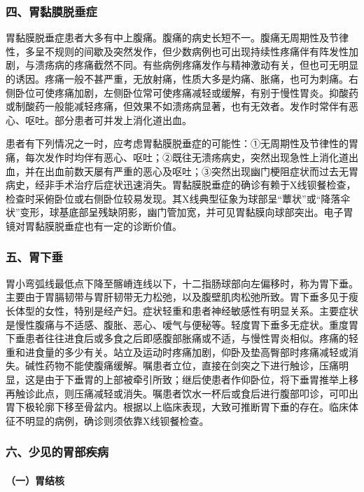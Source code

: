 \subsubsection{四、胃黏膜脱垂症}

胃黏膜脱垂症患者大多有中上腹痛。腹痛的病史长短不一。腹痛无周期性及节律性，多呈不规则的间歇及突然发作，但少数病例也可出现持续性疼痛伴有阵发性加剧，与溃疡病的疼痛截然不同。有些病例疼痛发作与精神激动有关，但也可无明显的诱因。疼痛一般不甚严重，无放射痛，性质大多是灼痛、胀痛，也可为刺痛。右侧卧位可使疼痛加剧，左侧卧位常可使疼痛减轻或缓解，有别于慢性胃炎。抑酸药或制酸药一般能减轻疼痛，但效果不如溃疡病显著，也有无效者。发作时常伴有恶心、呕吐。部分患者可并发上消化道出血。

患者有下列情况之一时，应考虑胃黏膜脱垂症的可能性：①无周期性及节律性的胃痛，每次发作时均伴有恶心、呕吐；②既往无溃疡病史，突然出现急性上消化道出血，并在出血前数天屡有严重的恶心及呕吐；③突然出现幽门梗阻症状而过去无胃病史，经非手术治疗后症状迅速消失。胃黏膜脱垂症的确诊有赖于X线钡餐检查，检查时采俯卧位或右侧卧位较易发现。其X线典型征象为球部呈“蕈状”或“降落伞状”变形，球基底部呈残缺阴影，幽门管加宽，并可见胃黏膜向球部突出。电子胃镜对胃黏膜脱垂症也有一定的诊断价值。

\subsubsection{五、胃下垂}

胃小弯弧线最低点下降至髂嵴连线以下，十二指肠球部向左偏移时，称为胃下垂。主要由于胃膈韧带与胃肝韧带无力松弛，以及腹壁肌肉松弛所致。胃下垂多见于瘦长体型的女性，特别是经产妇。症状轻重和患者神经敏感性有明显关系。主要症状是慢性腹痛与不适感、腹胀、恶心、嗳气与便秘等。轻度胃下垂多无症状。重度胃下垂患者往往进食后或多食之后即感腹部胀痛或不适，与慢性胃炎相似。疼痛的轻重和进食量的多少有关。站立及运动时疼痛加剧，仰卧及垫高臀部时疼痛减轻或消失。碱性药物不能使腹痛缓解。嘱患者立位，直接在剑突之下进行触诊，压痛明显，这是由于下垂胃的上部被牵引所致；继后使患者作仰卧位，将下垂胃推举上移再触诊此点，则压痛减轻或消失。嘱患者饮水一杯后或食后进行腹部叩诊，可叩出胃下极轮廓下移至骨盆内。根据以上临床表现，大致可推断胃下垂的存在。临床体征不明显的病例，确诊则须依靠X线钡餐检查。

\subsubsection{六、少见的胃部疾病}

\paragraph{（一）胃结核}

